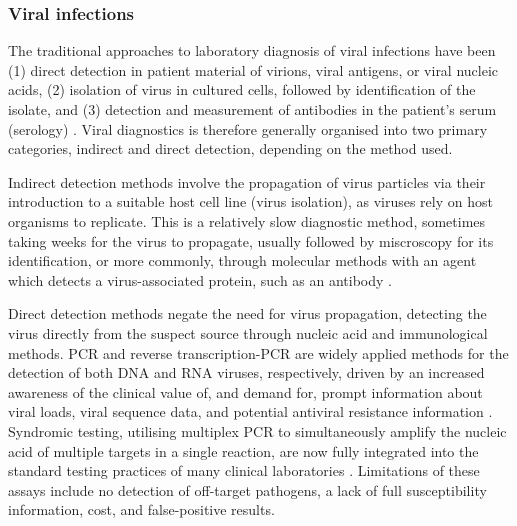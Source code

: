 \subsubsection{Viral infections} \label{sssec:viral}

The traditional approaches to laboratory diagnosis of viral infections have been (1) direct detection in patient material of virions, viral antigens, or viral nucleic acids, (2) isolation of virus in cultured cells, followed by identification of the isolate, and (3) detection and measurement of antibodies in the patient’s serum (serology) \citep{burrell_laboratory_2017}. Viral diagnostics is therefore generally organised into two primary categories, indirect and direct detection, depending on the method used. 

Indirect detection methods involve the propagation of virus particles via their introduction to a suitable host cell line (virus isolation), as viruses rely on host organisms to replicate. This is a relatively slow diagnostic method, sometimes taking weeks for the virus to propagate, usually followed by miscroscopy for its identification, or more commonly, through molecular methods with an agent which detects a virus-associated protein, such as an antibody \citep{cassedy_virus_2021}. 

Direct detection methods negate the need for virus propagation, detecting the virus directly from the suspect source through nucleic acid and immunological methods. PCR and reverse transcription-PCR are widely applied methods for the detection of both DNA and RNA viruses, respectively, driven by an increased awareness of the clinical value of, and demand for, prompt information about viral loads, viral sequence data, and potential antiviral resistance information \citep{cassedy_virus_2021}. Syndromic testing, utilising multiplex PCR to simultaneously amplify the nucleic acid of multiple targets in a single reaction, are now fully integrated into the standard testing practices of many clinical laboratories \citep{dien_bard_panels_2020}. Limitations of these assays include no detection of off-target pathogens, a lack of full susceptibility information, cost, and false-positive results.


